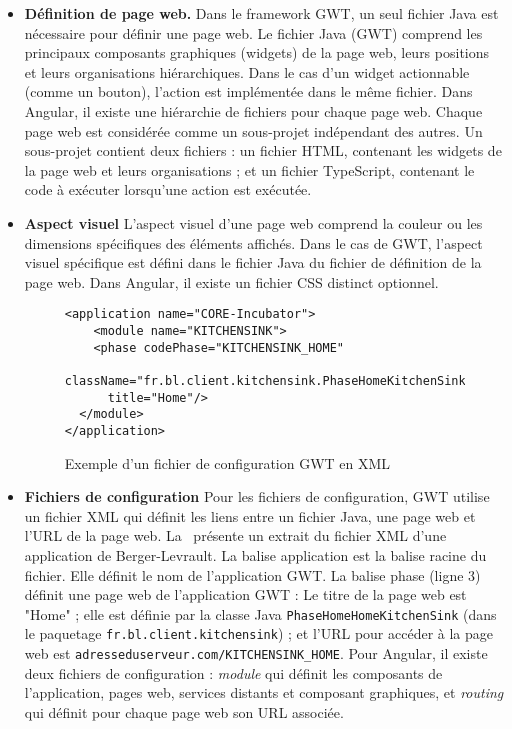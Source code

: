 \documentclass[a4paper]{article}
\begin{document}
\begin{itemize}
\item \textbf{Définition de page web.} 
Dans le framework GWT, un seul fichier Java est nécessaire pour définir une page web.
Le fichier Java (GWT) comprend les principaux composants graphiques (widgets) de la page web,
  leurs positions et leurs organisations hiérarchiques.
Dans le cas d'un widget actionnable (comme un bouton), l'action est implémentée dans le même fichier.
Dans Angular, il existe une hiérarchie de fichiers pour chaque page web.
Chaque page web est considérée comme un sous-projet indépendant des autres.
Un sous-projet contient deux fichiers :
  un fichier HTML, contenant les widgets de la page web et leurs organisations ; 
  et un fichier TypeScript, contenant le code à exécuter lorsqu'une action est exécutée. 

\item \textbf{Aspect visuel}
L'aspect visuel d'une page web comprend la couleur ou les dimensions spécifiques des éléments affichés.
Dans le cas de GWT, l'aspect visuel spécifique est défini dans le fichier Java du fichier de définition de la page web.
Dans Angular, il existe un fichier CSS distinct optionnel.

\begin{figure}[htbp]
  \centering
  \begin{lstlisting}
<application name="CORE-Incubator">
	<module name="KITCHENSINK">
    <phase codePhase="KITCHENSINK_HOME" 
      className="fr.bl.client.kitchensink.PhaseHomeKitchenSink" 
      title="Home"/>
  </module>
</application>
  \end{lstlisting}
  \caption{Exemple d'un fichier de configuration GWT en XML}
  \label{fig:xmlExample}
\end{figure}


\item \textbf{Fichiers de configuration}
Pour les fichiers de configuration, GWT utilise un fichier XML qui définit les
  liens entre un fichier Java, une page web et l'URL de la page web.
La~ présente un extrait du fichier XML d'une application de Berger-Levrault.
La balise application est la balise racine du fichier.
Elle définit le nom de l'application GWT.
La balise phase (ligne 3) définit une page web de l'application GWT : Le titre de la page web est "Home" ;
  elle est définie par la classe Java \texttt{PhaseHomeHomeKitchenSink} (dans le paquetage \texttt{fr.bl.client.kitchensink}) ; et
  l'URL pour accéder à la page web est \texttt{adresseduserveur.com/KITCHENSINK\_HOME}.
Pour Angular, il existe deux fichiers de configuration : \emph{module} qui définit les composants de l'application, \eg pages web, services distants et composant graphiques,
  et \emph{routing} qui définit pour chaque page web son URL associée.
\end{itemize}
\end{document}
